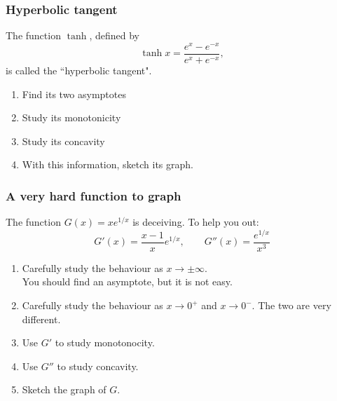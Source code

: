 \documentclass[14pt]{beamer}
\begin{document}
	\begin{frame}[t]
		\frametitle{Hyperbolic tangent}

		The function $\tanh$, defined by
		\[
			\tanh x = \frac{e^{x}- e^{-x}}{e^{x}+ e^{-x}},
		\]
		is called the ``hyperbolic tangent".
		\begin{enumerate}
			\item Find its two asymptotes

			\item Study its monotonicity

			\item Study its concavity

			\item With this information, sketch its graph.
		\end{enumerate}
	\end{frame}

	\begin{frame}[t]
		\frametitle{A very hard function to graph}

		The function $\displaystyle G(x) = x e^{1/x}$ is deceiving. To help you out:
		\[
			G'(x) = \frac{x-1}{x}e^{1/x}, \quad \quad G''(x) = \frac{e^{1/x}}{x^{3}}
		\]

		\begin{enumerate}
			\item Carefully study the behaviour as $x \to \pm \infty$. \\ You should
				find an asymptote, but it is not easy.

			\item Carefully study the behaviour as $x \to 0^{+}$ and $x\to 0^{-}$. The
				two are very different.

			\item Use $G'$ to study monotonocity.

			\item Use $G''$ to study concavity.

			\item Sketch the graph of $G$.
		\end{enumerate}
	\end{frame}

\end{document}
